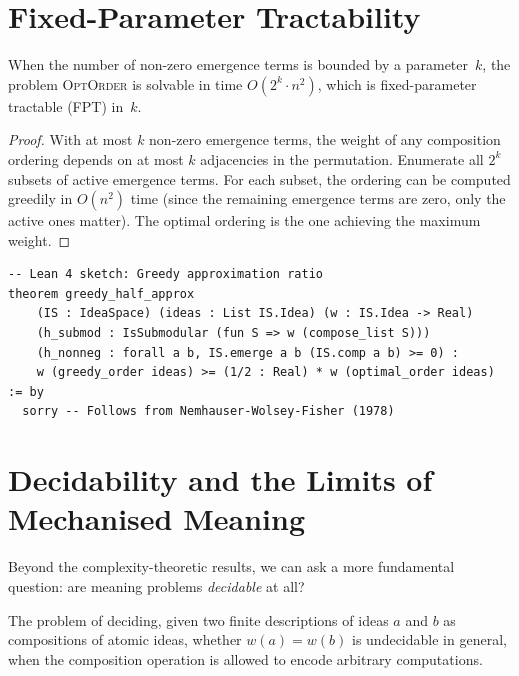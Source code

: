 \section{Fixed-Parameter Tractability}
\label{sec:fpt}

\begin{theorem}
\label{thm:fpt}
When the number of non-zero emergence terms is bounded by a
parameter~$k$, the problem \textsc{OptOrder} is solvable in
time $O(2^k \cdot n^2)$, which is fixed-parameter tractable (FPT)
in~$k$.
\end{theorem}

\begin{proof}
With at most $k$ non-zero emergence terms, the weight of any
composition ordering depends on at most $k$ adjacencies in the
permutation.  Enumerate all $2^k$ subsets of active emergence
terms.  For each subset, the ordering can be computed greedily
in $O(n^2)$ time (since the remaining emergence terms are zero,
only the active ones matter).  The optimal ordering is the one
achieving the maximum weight.
\end{proof}

\begin{lstlisting}
-- Lean 4 sketch: Greedy approximation ratio
theorem greedy_half_approx
    (IS : IdeaSpace) (ideas : List IS.Idea) (w : IS.Idea -> Real)
    (h_submod : IsSubmodular (fun S => w (compose_list S)))
    (h_nonneg : forall a b, IS.emerge a b (IS.comp a b) >= 0) :
    w (greedy_order ideas) >= (1/2 : Real) * w (optimal_order ideas) := by
  sorry -- Follows from Nemhauser-Wolsey-Fisher (1978)
\end{lstlisting}

\section{Decidability and the Limits of Mechanised Meaning}
\label{sec:decidability}

Beyond the complexity-theoretic results, we can ask a more fundamental
question: are meaning problems \emph{decidable} at all?

\begin{theorem}
\label{thm:undecidable-resonance}
The problem of deciding, given two finite descriptions of ideas
$a$ and $b$ as compositions of atomic ideas, whether $w(a) = w(b)$
is undecidable in general, when the composition operation is allowed
to encode arbitrary computations.
\end{theorem}


